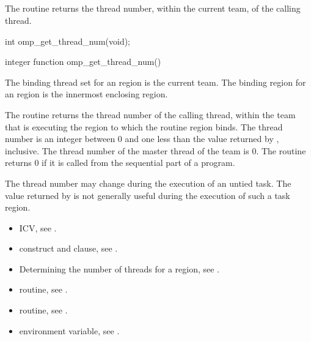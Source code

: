 \subsection{}
\label{subsec:omp_get_thread_num}
\summary
The  routine returns the thread number, 
within the current team, of the calling thread.

\format
\begin{ccppspecific}
\begin{ompcFunction}
int omp_get_thread_num(void);
\end{ompcFunction}
\end{ccppspecific}

\begin{fortranspecific}
\begin{ompfFunction}
integer function omp_get_thread_num()
\end{ompfFunction}
\end{fortranspecific}

\binding
The binding thread set for an  region is 
the current team. The binding region for an  
region is the innermost enclosing  region.

\effect
The  routine returns the thread number of the 
calling thread, within the team that is executing the  
region to which the routine region binds. The thread number is an integer 
between 0 and one less than the value returned by , 
inclusive. The thread number of the master thread of the team is 0. The 
routine returns 0 if it is called from the sequential part of a program.

\begin{note}
The thread number may change during the execution of an untied task. The
value returned by  is not generally useful during 
the execution of such a task region.
\end{note}

\crossreferences
\begin{itemize}
\item {} ICV, see
.

\item {} construct and  clause, see
.

\item Determining the number of threads for a  region, see
.

\item {} routine, see
.

\item {} routine, see
.

\item {} environment variable, see
.
\end{itemize}



